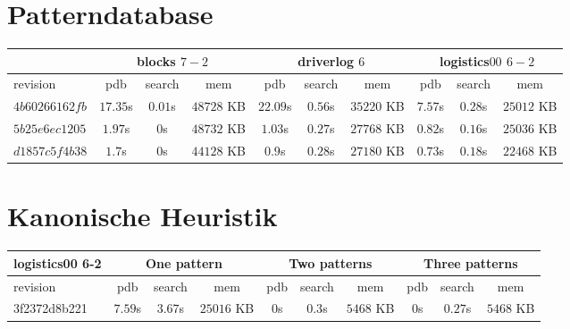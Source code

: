 \documentclass[a4paper,12pt]{scrartcl}
\begin{document}
\section{Patterndatabase}

\begin{tabular}{|l|c|c|c|c|c|c|c|c|c|}\hline
& \multicolumn{3}{c|}{blocks $7-2$} & \multicolumn{3}{c|}{driverlog $6$} & \multicolumn{3}{c|}{logistics$00$ $6-2$}\\\hline
revision & pdb & search & mem & pdb & search & mem & pdb & search & mem\\\hline
$4b60266162fb$ & $17.35$s & $0.01$s & $48728$ KB & $22.09$s & $0.56$s & $35220$ KB & $7.57$s & $0.28$s & $25012$ KB\\\hline
$5b25e6ec1205$ & $1.97$s & $0$s & $48732$ KB & $1.03$s & $0.27$s & $27768$ KB & $0.82$s & $0.16$s & $25036$ KB\\\hline
$d1857c5f4b38$ & $1.7$s & $0$s & $44128$ KB & $0.9$s & $0.28$s & $27180$ KB & $0.73$s & $0.18$s & $22468$ KB\\\hline
\end{tabular}

\section{Kanonische Heuristik}

\begin{tabular}{|l|c|c|c|c|c|c|c|c|c|}\hline
logistics00 6-2 & \multicolumn{3}{c|}{One pattern} & \multicolumn{3}{c|}{Two patterns} & \multicolumn{3}{c|}{Three patterns}\\\hline
revision & pdb & search & mem & pdb & search & mem & pdb & search & mem\\\hline
3f2372d8b221 & $7.59$s & $3.67$s & $25016$ KB & $0$s & $0.3$s & $5468$ KB & $0$s & $0.27$s & $5468$ KB\\\hline
\end{tabular}
\end{document}
